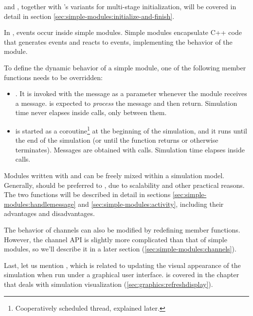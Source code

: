  and , together with 's
variants for multi-stage initialization, will be covered in detail in
section \ref{sec:simple-modules:initialize-and-finish}.

In {\opp}, events occur inside simple modules.
Simple modules encapsulate C++ code that generates events and reacts to events,
implementing the behavior of the module.

To define the dynamic behavior of a simple module, one of the following
member functions needs to be overridden:

\begin{itemize}
  \item {}. It
     is invoked with the message as a parameter whenever the
     module receives a message.  is
     expected to \textit{process} the message and then return.
     Simulation time never elapses inside  calls, only between them.
  \item {} is started as a coroutine\footnote{Cooperatively
     scheduled thread, explained later.} at the beginning of the simulation, and
     it runs until the end of the simulation (or until the function
     returns or otherwise terminates). Messages are obtained with
      calls. Simulation time elapses inside
      calls.
\end{itemize}

Modules written with  and  can be
freely mixed within a simulation model. Generally, 
should be preferred to , due to scalability and other
practical reasons. The two functions will be described in detail in sections
\ref{sec:simple-modules:handlemessage} and \ref{sec:simple-modules:activity},
including their advantages and disadvantages.

The behavior of channels can also be modified by redefining member functions.
However, the channel API is slightly more complicated than that of simple
modules, so we'll describe it in a later section (\ref{sec:simple-modules:channels}).

Last, let us mention , which is related to updating
the visual appearance of the simulation when run under a graphical user
interface.  is covered in the chapter that deals
with simulation visualization (\ref{sec:graphics:refreshdisplay}).

